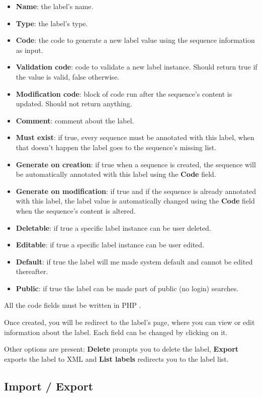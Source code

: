 \begin{itemize}
  \item \textbf{Name}: the label's name.
  \item \textbf{Type}: the label's type.
  \item \textbf{Code}: the code to generate a new label value using the sequence information as input.
  \item \textbf{Validation code}: code to validate a new label instance. Should return true if the value is valid, false otherwise.
  \item \textbf{Modification code}: block of code run after the sequence's content is updated. Should not return anything.
  \item \textbf{Comment}: comment about the label.
  \item \textbf{Must exist}: if true, every sequence must be annotated with this label, when that doesn't happen the label goes to the sequence's missing list.
  \item \textbf{Generate on creation}: if true when a sequence is created, the sequence will be automatically annotated with this label using the \textbf{Code} field.
  \item \textbf{Generate on modification}: if true and if the sequence is already annotated with this label, the label value is automatically changed using the \textbf{Code} field when the sequence's content is altered.
  \item \textbf{Deletable}: if true a specific label instance can be user deleted.
  \item \textbf{Editable}: if true a specific label instance can be user edited.
  \item \textbf{Default}: if true the label will me made system default and cannot be edited thereafter.
  \item \textbf{Public}: if true the label can be made part of public (no login) searches. 
\end{itemize}

All the code fields must be written in PHP \cite{php}.

Once created, you will be redirect to the label's page, where you can view or edit information about
the label. Each field can be changed by clicking on it.

Other options are present: \textbf{Delete} prompts you to delete the label, \textbf{Export} exports the label
to XML and \textbf{List labels} redirects you to the label list.

\subsection{Import / Export}

